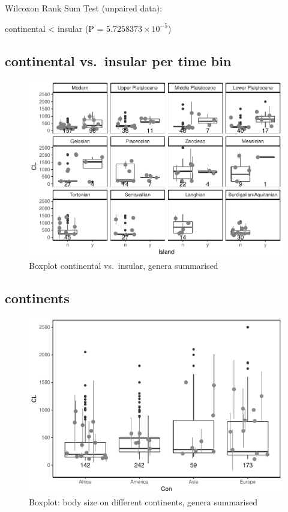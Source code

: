 \documentclass[]{article}
\begin{document}
Wilcoxon Rank Sum Test (unpaired data):

continental \textless{} insular (P = \(5.7258373\times 10^{-5}\))

\newpage

\subsection{continental vs.~insular per time
bin}\label{continental-vs.insular-per-time-bin-1}

\begin{figure}[htbp]
\centering
\includegraphics{MA_JJ_files/figure-latex/BPCIBins-1.pdf}
\caption{Boxplot continental vs.~insular, genera summarised}
\end{figure}

\newpage

\subsection{continents}\label{continents-1}

\begin{figure}[htbp]
\centering
\includegraphics{MA_JJ_files/figure-latex/BPCon-1.pdf}
\caption{Boxplot: body size on different continents, genera summarised}
\end{figure}
\end{document}
